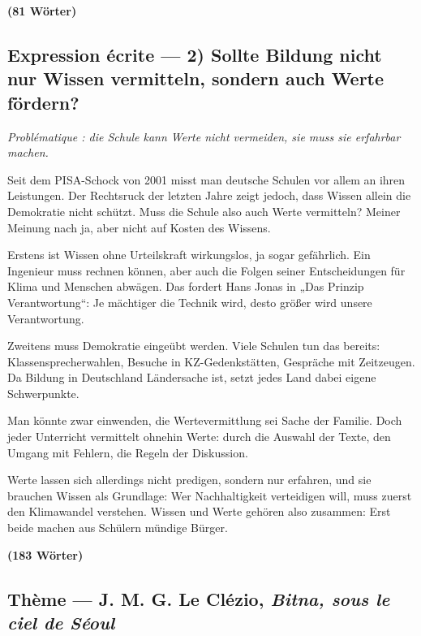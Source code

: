 \documentclass[11pt,a4paper]{article}
\begin{document}
\textbf{(81 Wörter)}

\hypertarget{expression-uxe9crite-2-sollte-bildung-nicht-nur-wissen-vermitteln-sondern-auch-werte-fuxf6rdern}{%
\subsection{Expression écrite --- 2) Sollte Bildung nicht nur Wissen vermitteln, sondern auch Werte fördern?}\label{expression-uxe9crite-2-sollte-bildung-nicht-nur-wissen-vermitteln-sondern-auch-werte-fuxf6rdern}}

\emph{Problématique : die Schule kann Werte nicht vermeiden, sie muss sie erfahrbar machen.}

Seit dem PISA-Schock von 2001 misst man deutsche Schulen vor allem an ihren Leistungen. Der Rechtsruck der letzten Jahre zeigt jedoch, dass Wissen allein die Demokratie nicht schützt. Muss die Schule also auch Werte vermitteln? Meiner Meinung nach ja, aber nicht auf Kosten des Wissens.

Erstens ist Wissen ohne Urteilskraft wirkungslos, ja sogar gefährlich. Ein Ingenieur muss rechnen können, aber auch die Folgen seiner Entscheidungen für Klima und Menschen abwägen. Das fordert Hans Jonas in „Das Prinzip Verantwortung``: Je mächtiger die Technik wird, desto größer wird unsere Verantwortung.

Zweitens muss Demokratie eingeübt werden. Viele Schulen tun das bereits: Klassensprecherwahlen, Besuche in KZ-Gedenkstätten, Gespräche mit Zeitzeugen. Da Bildung in Deutschland Ländersache ist, setzt jedes Land dabei eigene Schwerpunkte.

Man könnte zwar einwenden, die Wertevermittlung sei Sache der Familie. Doch jeder Unterricht vermittelt ohnehin Werte: durch die Auswahl der Texte, den Umgang mit Fehlern, die Regeln der Diskussion.

Werte lassen sich allerdings nicht predigen, sondern nur erfahren, und sie brauchen Wissen als Grundlage: Wer Nachhaltigkeit verteidigen will, muss zuerst den Klimawandel verstehen. Wissen und Werte gehören also zusammen: Erst beide machen aus Schülern mündige Bürger.

\textbf{(183 Wörter)}

\hypertarget{thuxe8me-j.-m.-g.-le-cluxe9zio-bitna-sous-le-ciel-de-suxe9oul}{%
\subsection{\texorpdfstring{Thème --- J. M. G. Le Clézio, \emph{Bitna, sous le ciel de Séoul}}{Thème --- J. M. G. Le Clézio, Bitna, sous le ciel de Séoul}}\label{thuxe8me-j.-m.-g.-le-cluxe9zio-bitna-sous-le-ciel-de-suxe9oul}}
\end{document}
